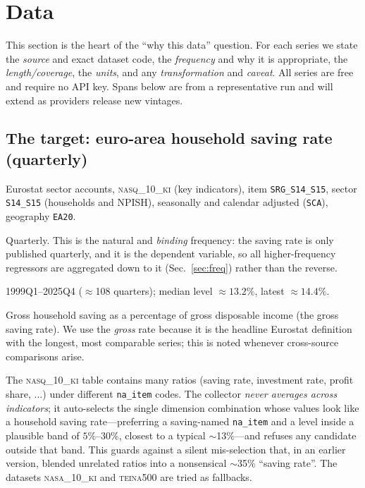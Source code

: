 \documentclass[11pt,a4paper]{article}
\newcommand{\code}[1]{\texttt{#1}}
\newcommand{\dataset}[1]{\textsc{#1}}
\begin{document}
\section{Data}\label{sec:data}

This section is the heart of the ``why this data'' question. For each series we
state the \emph{source} and exact dataset code, the \emph{frequency} and why it
is appropriate, the \emph{length/coverage}, the \emph{units}, and any
\emph{transformation} and \emph{caveat}. All series are free and require no API
key. Spans below are from a representative run and will extend as providers
release new vintages.

\subsection{The target: euro-area household saving rate (quarterly)}
\begin{description}[leftmargin=1.4em,style=nextline]
\item[Source / code] Eurostat sector accounts, \dataset{nasq\_10\_ki} (key
  indicators), item \code{SRG\_S14\_S15}, sector \code{S14\_S15} (households and
  NPISH), seasonally and calendar adjusted (\code{SCA}), geography \code{EA20}.
\item[Frequency] Quarterly. This is the natural and \emph{binding} frequency: the
  saving rate is only published quarterly, and it is the dependent variable, so
  all higher-frequency regressors are aggregated down to it (Sec.~\ref{sec:freq})
  rather than the reverse.
\item[Coverage] 1999Q1--2025Q4 ($\approx$108 quarters); median level $\approx
  13.2\%$, latest $\approx 14.4\%$.
\item[Units] Gross household saving as a percentage of gross disposable income
  (the gross saving rate). We use the \emph{gross} rate because it is the
  headline Eurostat definition with the longest, most comparable series; this is
  noted whenever cross-source comparisons arise.
\item[Why this exact series] The \dataset{nasq\_10\_ki} table contains many
  ratios (saving rate, investment rate, profit share, $\ldots$) under different
  \code{na\_item} codes. The collector \emph{never averages across indicators};
  it auto-selects the single dimension combination whose values look like a
  household saving rate---preferring a saving-named \code{na\_item} and a level
  inside a plausible band of $5\%$--$30\%$, closest to a typical $\sim$13\%---and
  refuses any candidate outside that band. This guards against a silent
  mis-selection that, in an earlier version, blended unrelated ratios into a
  nonsensical $\sim$35\% ``saving rate''. The datasets \dataset{nasa\_10\_ki} and
  \dataset{teina500} are tried as fallbacks.
\end{description}
\end{document}
